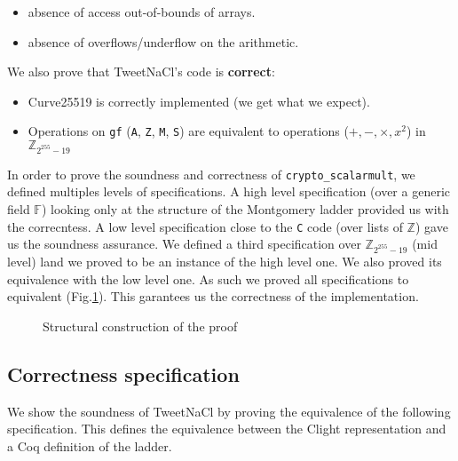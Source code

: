 \begin{itemize}
\item absence of access out-of-bounds of arrays.
\item absence of overflows/underflow on the arithmetic.
\end{itemize}

We also prove that TweetNaCl's code is \textbf{correct}:

\begin{itemize}
\item Curve25519 is correctly implemented (we get what we expect).
\item Operations on \texttt{gf} (\texttt{A}, \texttt{Z}, \texttt{M}, \texttt{S})
are equivalent to operations ($+,-,\times,x^2$) in $\mathbb{Z}_{2^{255}-19}$
\end{itemize}


In order to prove the soundness and correctness of \texttt{crypto\_scalarmult},
we defined multiples levels of specifications.
A high level specification (over a generic field $\mathbb{F}$) looking only at
the structure of the Montgomery ladder provided us with the correcntess.
A low level specification close to the \texttt{C} code (over lists of $\mathbb{Z}$)
gave us the soundness assurance.
We defined a third specification over $\mathbb{Z}_{2^{255}-19}$ (mid level) land
we proved to be an instance of the high level one.
We also proved its equivalence with the low level one.
As such we proved all specifications to equivalent (Fig.\ref{tk:ProofStructure}).
This garantees us the correctness of the
implementation.

\begin{figure}[h]
  
  \caption{Structural construction of the proof}
  \label{tk:ProofStructure}
\end{figure}

\subsection{Correctness specification}

We show the soundness of TweetNaCl by proving the equivalence of the following
specification. This defines the equivalence between the Clight representation
and a Coq definition of the ladder.

